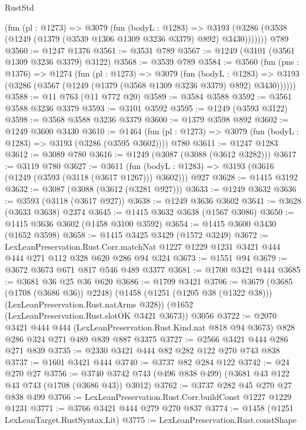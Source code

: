 \begin{lexlean}{RustStd}
\begin{coremodule}
{\begin{coremodule}
{{{{{{{{{{{        (fun (pl : @1273) =>
        @3079
          (fun (bodyL : @1283) =>
          @3193 (@3286 (@3538 (@1249 (@1379 (@3539 @1306 @1309 @3236 @3379) @892) @3430)))))))
    @789
@3560 := @1247 @1376
@3561 := @3531 @789
@3567 := @1249 (@3101 (@3561 @1309 @3236 @3379) @3122)
@3568 := @3539 @789
@3584 := @3560
    (fun (pns : @1376) =>
    @1274
      (fun (pl : @1273) =>
      @3079
        (fun (bodyL : @1283) =>
        @3193 (@3286 (@3567 (@1249 (@1379 (@3568 @1309 @3236 @3379) @892) @3430))))))
@3588 := @11 @763 (@11 @772 @20)
@3589 := @3584 @3588
@3592 := @3561 @3588 @3236 @3379
@3593 := @3101 @3592
@3595 := @1249 (@3593 @3122)
@3598 := @3568 @3588 @3236 @3379
@3600 := @1379 @3598 @892
@3602 := @1249 @3600 @3430
@3610 := @1464 (fun (pl : @1273) => @3079 (fun (bodyL : @1283) => @3193 (@3286 (@3595 @3602)))) @780
@3611 := @1247 @1283
@3612 := @3089 @780
@3616 := @1249 (@3087 (@3088 (@3612 @3282)))
@3617 := @3119 @780
@3627 := @3611
    (fun (bodyL : @1283) => @3193 (@3616 (@1249 (@3593 (@3118 (@3617 @1267))) @3602)))
    @927
@3628 := @1415 @3192
@3632 := @3087 (@3088 (@3612 (@3281 @927)))
@3633 := @1249 @3632
@3636 := @3593 (@3118 (@3617 @927))
@3638 := @1249 @3636 @3602
@3641 := @3628 (@3633 @3638) @2374
@3645 := @1415 @3632 @3638 (@1567 @3086)
@3650 := @1415 @3636 @3602 (@1458 @3100 @3592)
@3654 := @1415 @3600 @3430 (@1652 @3598)
@3658 := @1415 @3425 @3429 (@1572 @3249)
@3672 := LexLeanPreservation.Rust.Corr.matchNat
    @1227
    @1229
    @1231
    @3421
    @444
    @444
    @271
    @112
    @328
    @620
    @286
    @94
    @324
@3673 := @1551 @94
@3679 := @3672 @3673 @671 @817 @546 @489 @3377
@3681 := @1700 @3421 @444
@3685 := @3681 @36 @25 @36 @620
@3686 := @1709 @3421
@3706 := @3679
    (@3685 (@1708 (@3686 @36)) @2248)
    (@1458 (@1251 (@1205 @38 (@1322 @38))) (LexLeanPreservation.Rust.natArms @328))
    (@1652 (LexLeanPreservation.Rust.slotOK @3421 @3673))
    @3056
@3722 := @2070
    @3421
    @444
    @444
    (LexLeanPreservation.Rust.Kind.nat @818 @94 @3673)
    @828
    @286
    @324
    @271
    @489
    @839
    @887
    @3375
@3727 := @2566 @3421 @444 @286 @271 @839
@3735 := @2330 @3421 @444 @82 @282 @122 @270 @743 @838
@3737 := @1601 @3421 @444
@3740 := @3737 @82 @284 @122
@3742 := @24 @270 @27
@3756 := @3740 @3742 @743 (@496 @838 @499) (@3681 @43 @122 @43 @743 (@1708 (@3686 @43)) @3012)
@3762 := @3737 @282 @45 @270 @27 @838 @499
@3766 := LexLeanPreservation.Rust.Corr.buildConst @1227 @1229 @1231
@3771 := @3766 @3421 @444 @279 @270 @837
@3774 := @1458 (@1251 LexLeanTarget.RustSyntax.Lit)
@3775 := LexLeanPreservation.Rust.constShape
}}}}}}}}}}}
\end{coremodule}}
\end{coremodule}
\end{lexlean}

